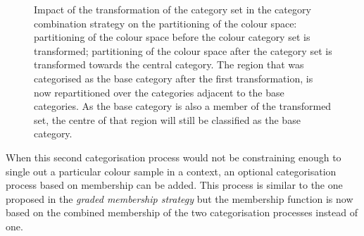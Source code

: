 \begin{figure}[htbp]
\centering
{}
\caption[Impact of the transformation of the category set in the
category combination strategy on the partitioning of the colour
space]{Impact of the transformation of the category set in the
  category combination strategy on the partitioning of the
  colour space: 
  partitioning of the colour space before the colour category set is
  transformed;  partitioning of
  the colour space after the category set is transformed towards the
  central category. The region that was categorised as
  the base category after the first transformation, is now repartitioned over the categories adjacent
  to the base categories. As the base category is also a member of the
  transformed set, the centre of that region will still be classified
  as the base category.}
\label{f:ccs-semantics-transformation}
\end{figure}

When this second categorisation process would not be constraining
enough to single out a particular colour sample in a context, an
optional categorisation process based on membership can be added.
This process is similar to the one proposed in the \emph{graded
  membership strategy} but the membership function is now based on the
combined membership of the two categorisation processes instead of
one.


